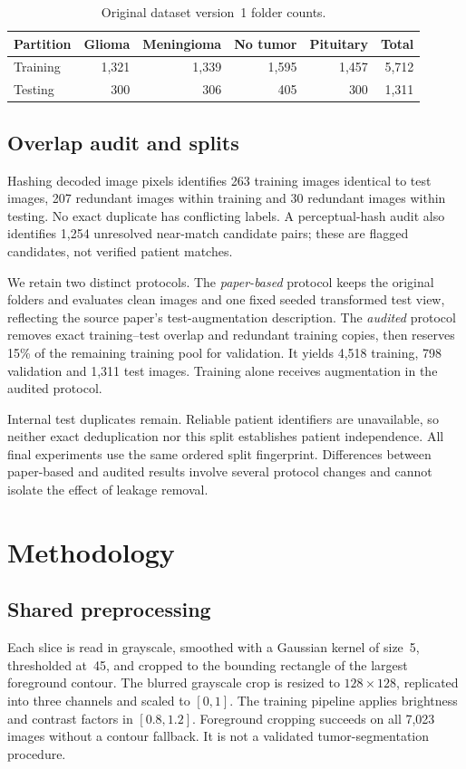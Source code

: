 \documentclass[11pt,a4paper]{article}
\begin{document}
\begin{table}[tb]
\centering
\caption{Original dataset version~1 folder counts.}
\label{tab:data}
\begin{tabular}{lrrrrr}
\toprule
Partition & Glioma & Meningioma & No tumor & Pituitary & Total\\
\midrule
Training & 1,321 & 1,339 & 1,595 & 1,457 & 5,712\\
Testing & 300 & 306 & 405 & 300 & 1,311\\
\bottomrule
\end{tabular}
\end{table}

\subsection{Overlap audit and splits}
Hashing decoded image pixels identifies 263 training images identical to test
images, 207 redundant images within training and 30 redundant images within
testing. No exact duplicate has conflicting labels. A perceptual-hash audit
also identifies 1,254 unresolved near-match candidate pairs; these are flagged
candidates, not verified patient matches.

We retain two distinct protocols. The \emph{paper-based} protocol keeps the
original folders and evaluates clean images and one fixed seeded transformed
test view, reflecting the source paper's test-augmentation description. The
\emph{audited} protocol removes exact training--test overlap and redundant
training copies, then reserves 15\% of the remaining training pool for
validation. It yields 4,518 training, 798 validation and 1,311 test images.
Training alone receives augmentation in the audited protocol.

Internal test duplicates remain. Reliable patient identifiers are unavailable,
so neither exact deduplication nor this split establishes patient independence.
All final experiments use the same ordered split fingerprint. Differences
between paper-based and audited results involve several protocol changes and
cannot isolate the effect of leakage removal.

\section{Methodology}
\subsection{Shared preprocessing}
Each slice is read in grayscale, smoothed with a Gaussian kernel of size~5,
thresholded at~45, and cropped to the bounding rectangle of the largest
foreground contour. The blurred grayscale crop is resized to $128\times128$,
replicated into three channels and scaled to $[0,1]$. The training pipeline
applies brightness and contrast factors in $[0.8,1.2]$. Foreground cropping
succeeds on all 7,023 images without a contour fallback. It is not a validated
tumor-segmentation procedure.
\end{document}
